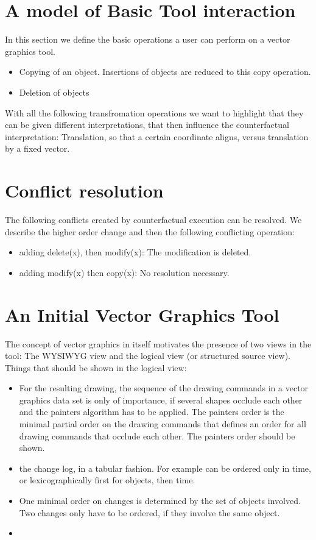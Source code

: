 \documentclass{sig-alternate}
\begin{document}
\section{A model of Basic Tool interaction}
In this section we define the basic operations a user can perform on a vector graphics tool.
\begin{itemize}
	\item Copying of an object. Insertions of objects are reduced to this copy operation.
	\item Deletion of objects
\end{itemize}
With all the following transfromation operations we want to highlight that they
can be given different interpretations, that then influence the counterfactual interpretation:
Translation, so that a certain coordinate aligns, versus translation by a fixed vector.


\section{Conflict resolution}
The following conflicts created by counterfactual execution can be resolved. We describe the higher order change and then the 
following conflicting operation:
\begin{itemize}
	\item adding delete(x), then modify(x): The modification is deleted.
	\item adding modify(x) then copy(x): No resolution necessary.
\end{itemize}



\section{An Initial Vector Graphics Tool}
The concept of vector graphics in itself motivates the presence of two views in the tool: The WYSIWYG view and the logical view (or structured source view). 
Things that should be shown in the logical view:

\begin{itemize}
	\item For the resulting drawing, the sequence of the drawing commands in a vector graphics data set is only of importance, 
if several shapes occlude each other and the painters algorithm has to be applied. The painters order is the minimal partial order on the drawing commands that defines an order for all drawing commands that occlude each other. The painters order should be shown.

	\item the change log, in a tabular fashion. For example can be ordered only in time, or lexicographically first for objects, then time.
	\item One minimal order on changes is determined by the set of objects involved.  Two changes only have to be ordered, if they involve the same object.
  \item 

\end{itemize}
\end{document}
